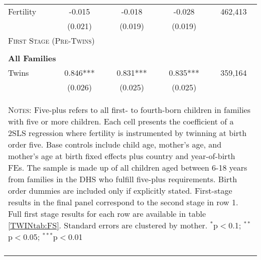 \begin{table}[!htbp]
\begin{tabular}{lcccc}
Fertility&-0.015&-0.018&-0.028&462,413\\
         &(0.021)&(0.019)&(0.019)&\\
\midrule\multicolumn{5}{l}{\textsc{First Stage (Pre-Twins)}}\\ 
&&&&\\
\multicolumn{5}{l}{\textbf{All Families}}\\ 
Twins&0.846***&0.831***&0.835***&359,164\\
         &(0.026)&(0.025)&(0.025)&\\
\hline\multicolumn{5}{p{10cm}}{\begin{footnotesize}\textsc{Notes:} Five-plus refers to all first- to fourth-born children in families with five or more children.  Each cell presents the coefficient of a 2SLS regression where fertility is instrumented by twinning at birth order five.  Base controls include child age, mother's age, and mother's age at birth fixed effects plus country and year-of-birth FEs.  The sample is made up of all children aged between 6-18 years from families in the DHS who fulfill five-plus requirements. Birth order dummies are included only if explicitly stated.  First-stage results in the final panel correspond to the second stage in row 1.  Full first stage results for each row are available in table \ref{TWINtab:FS}. Standard errors are clustered by mother. 
$^{*}$p$<$0.1; $^{**}$p$<$0.05; $^{***}$p$<$0.01\end{footnotesize}}
\\\bottomrule\normalsize\end{tabular}\end{table} 
